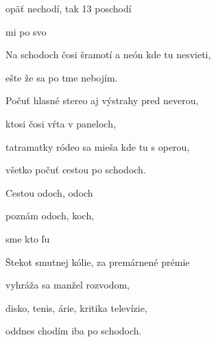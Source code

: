 

\zs
{} opäť nechodí, tak  13 poschodí

 mi  po svo

Na schodoch čosi šramotí a neón kde tu nesvieti,

ešte že sa po tme nebojím.
\ks

\zs
Počuť hlasné stereo aj výstrahy pred neverou,

ktosi čosi vŕta v paneloch,

tatramatky ródeo sa mieša kde tu s operou,

všetko počuť cestou po schodoch.
\ks

\zr
Cestou odoch, odoch

 

poznám odoch, koch,

 sme kto  ľu
\kr

\zs
Štekot smutnej kólie, za premárnené prémie

vyhráža sa manžel rozvodom,

disko, tenis, árie, kritika televízie,

oddnes chodím iba po schodoch.
\ks

\zr \kr

\kp

